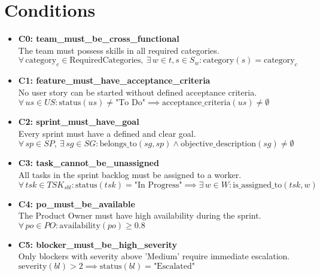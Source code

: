 \documentclass[11pt]{article}
\begin{document}
\section{Conditions}
\begin{itemize}
    \item \textbf{C0: team\_must\_be\_cross\_functional} \\
          The team must possess skills in all required categories. \\
          $\forall\, \text{category}_c \in \text{RequiredCategories},\ \exists\, w \in t, s \in S_w : \text{category}(s) = \text{category}_c$

    \item \textbf{C1: feature\_must\_have\_acceptance\_criteria} \\
          No user story can be started without defined acceptance criteria. \\
          $\forall\, us \in US : \text{status}(us) \neq \text{"To Do"} \implies \text{acceptance\_criteria}(us) \neq \emptyset$

    \item \textbf{C2: sprint\_must\_have\_goal} \\
          Every sprint must have a defined and clear goal. \\
          $\forall\, sp \in SP,\ \exists\, sg \in SG : \text{belongs\_to}(sg, sp) \wedge \text{objective\_description}(sg) \neq \emptyset$

    \item \textbf{C3: task\_cannot\_be\_unassigned} \\
          All tasks in the sprint backlog must be assigned to a worker. \\
          $\forall\, tsk \in TSK_{sbl} : \text{status}(tsk) = \text{"In Progress"} \implies \exists\, w \in W : \text{is\_assigned\_to}(tsk, w)$

    \item \textbf{C4: po\_must\_be\_available} \\
          The Product Owner must have high availability during the sprint. \\
          $\forall\, po \in PO : \text{availability}(po) \geq 0.8$

    \item \textbf{C5: blocker\_must\_be\_high\_severity} \\
          Only blockers with severity above 'Medium' require immediate escalation. \\
          $\text{severity}(bl) > 2 \implies \text{status}(bl) = \text{"Escalated"}$


\end{itemize}
\end{document}
